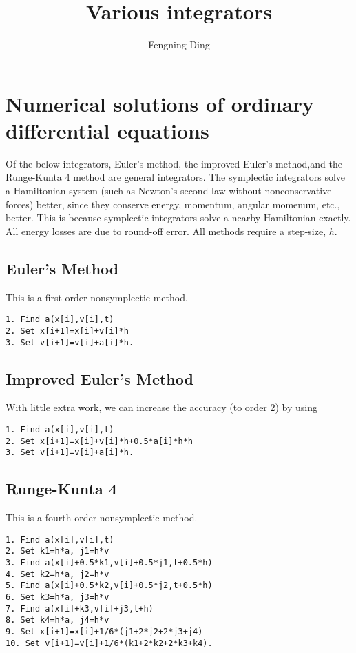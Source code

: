 \documentclass[11pt]{article}
\title{Various integrators}
\author{Fengning Ding}
\begin{document}
\maketitle

\section{Numerical solutions of ordinary differential equations}
Of the below integrators, Euler's method, the improved Euler's method,and the Runge-Kunta 4 method 
are general integrators. The symplectic integrators solve a Hamiltonian system (such as Newton's second law without nonconservative forces)
better, since they conserve energy, momentum, angular momenum, etc., better.
This is because symplectic integrators solve a nearby Hamiltonian exactly. All energy losses are due to round-off error.
All methods require a step-size, $h$.
\subsection{Euler's Method}
This is a first order nonsymplectic method.
\begin{verbatim}
1. Find a(x[i],v[i],t)
2. Set x[i+1]=x[i]+v[i]*h
3. Set v[i+1]=v[i]+a[i]*h.
\end{verbatim}

\subsection{Improved Euler's Method}
With little extra work, we can increase the accuracy (to order 2) by using
\begin{verbatim}
1. Find a(x[i],v[i],t)
2. Set x[i+1]=x[i]+v[i]*h+0.5*a[i]*h*h
3. Set v[i+1]=v[i]+a[i]*h.
\end{verbatim}

\subsection{Runge-Kunta 4}
This is a fourth order nonsymplectic method.
\begin{verbatim}
1. Find a(x[i],v[i],t)
2. Set k1=h*a, j1=h*v
3. Find a(x[i]+0.5*k1,v[i]+0.5*j1,t+0.5*h)
4. Set k2=h*a, j2=h*v
5. Find a(x[i]+0.5*k2,v[i]+0.5*j2,t+0.5*h)
6. Set k3=h*a, j3=h*v
7. Find a(x[i]+k3,v[i]+j3,t+h)
8. Set k4=h*a, j4=h*v
9. Set x[i+1]=x[i]+1/6*(j1+2*j2+2*j3+j4)
10. Set v[i+1]=v[i]+1/6*(k1+2*k2+2*k3+k4).
\end{verbatim}
\end{document}
